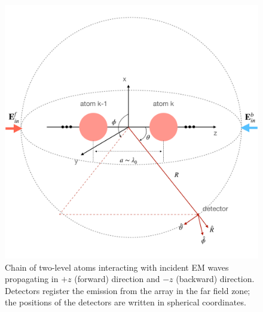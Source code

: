 \documentclass[aps,prl,twocolumn,superscriptaddress,showpacs,amsmath,amssymb]{revtex4-2}
\begin{document}
\begin{figure}[h]
    \centering
    \includegraphics[width=0.9\linewidth]{fig_1}
    \caption{Chain of two-level atoms interacting with incident EM waves propagating in $+z$ (forward) direction and $-z$ (backward) direction. Detectors register the emission from the array in the far field zone; the positions of the detectors are written in spherical coordinates.}
    \label{fig:01}
\end{figure}
\end{document}

